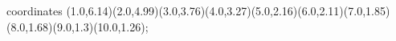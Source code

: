 					coordinates { (1.0,6.14)(2.0,4.99)(3.0,3.76)(4.0,3.27)(5.0,2.16)(6.0,2.11)(7.0,1.85)(8.0,1.68)(9.0,1.3)(10.0,1.26)};